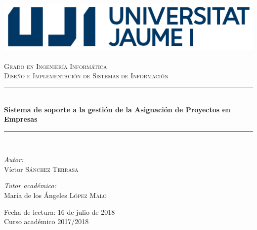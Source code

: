 \documentclass[pdftex,11pt,a4paper]{book}
\newcommand{\HRule}{\rule{\linewidth}{0.5mm}}
\begin{document}
\begin{titlepage}
\begin{center}

\includegraphics{img/marca-uji-2956.png}~\\[3.0cm]

\textsc{\LARGE Grado en Ingeniería Informática}\\[1.5cm]

\textsc{\LARGE Diseño e Implementación de Sistemas de Información}\\[1.5cm]

\HRule \\[0.4cm]
{ \huge \bfseries Sistema de soporte a la gestión de la Asignación de Proyectos en Empresas \\[0.4cm] }

\HRule \\[1.5cm]

\begin{minipage}{0.4\textwidth}
\begin{flushleft} \large
\emph{Autor:}\\
Víctor \textsc{Sánchez Terrasa}
\end{flushleft}
\end{minipage}
\begin{minipage}{0.4\textwidth}
\begin{flushright} \large
\emph{Tutor académico:} \\
María de los Ángeles \textsc{López Malo}
\end{flushright}
\end{minipage}

\vfill

{\large Fecha de lectura: 16 de julio de 2018\\
Curso académico 2017/2018}

\end{center}
\end{titlepage}
\setlength{\parskip}{\baselineskip}
\end{document}
